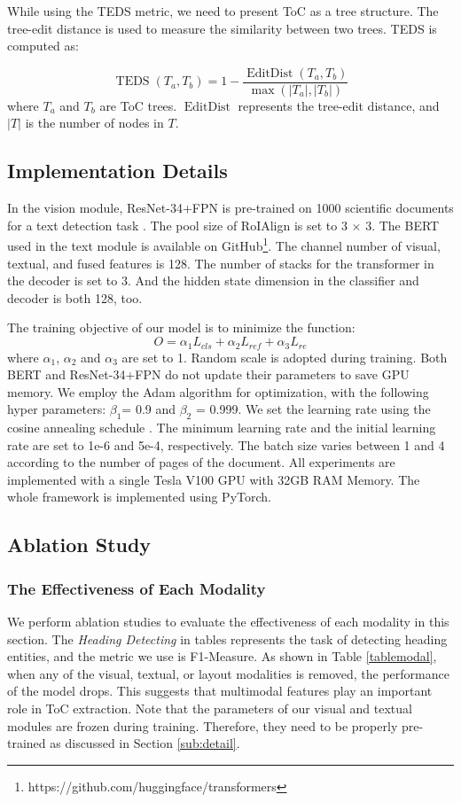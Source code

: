 \documentclass[a4paper,conference]{IEEEtran}
\begin{document}
While using the TEDS metric, we need to present ToC as a tree structure. The tree-edit distance\cite{ted} is used to measure the similarity between two trees. TEDS is computed as:

$$\operatorname{TEDS}\left(T_{a}, T_{b}\right)=1-\frac{\operatorname{EditDist}\left(T_{a}, T_{b}\right)}{\max \left(\left|T_{a}\right|,\left|T_{b}\right|\right)}$$
where $T_a$ and $T_b$ are ToC trees. $\operatorname{EditDist}$ represents the tree-edit distance, and $\left|T\right|$ is the number of nodes in $T$.

\subsection{Implementation Details\label{sub:detail}}
In the vision module, ResNet-34+FPN is pre-trained on 1000 scientific documents for a text detection task \cite{FCOS}. The pool size of RoIAlign is set to 3 $\times$ 3. The BERT used in the text module is available on GitHub\footnote{ https://github.com/huggingface/transformers}. The channel number of visual, textual, and fused features is 128. The number of stacks for the transformer in the decoder is set to 3. And the hidden state dimension in the classifier and decoder is both 128, too.

The training objective of our model is to minimize the function:
$$O = \alpha_1L_{cls} + \alpha_2L_{ref} +  \alpha_3L_{re}$$
where $\alpha_1$, $\alpha_2$ and $\alpha_3$ are set to 1. Random scale is adopted during training. Both BERT and ResNet-34+FPN do not update their parameters to save GPU memory. We employ the Adam algorithm \cite{adam} for optimization, with the following hyper parameters: $\beta_1$= 0.9 and $\beta_2$ = 0.999. We set the learning rate using the cosine annealing schedule \cite{cosineLR}. The minimum learning rate and the initial learning rate are set to 1e-6 and 5e-4, respectively. The batch size varies between 1 and 4 according to the number of pages of the document. All experiments are implemented with a single Tesla V100 GPU with 32GB RAM Memory. The whole framework is implemented using PyTorch. 



\subsection{Ablation Study}
\subsubsection{The Effectiveness of Each Modality}
We perform ablation studies to evaluate the effectiveness of each modality in this section. The \textit{Heading Detecting} in tables represents the task of detecting heading entities, and the metric we use is F1-Measure. As shown in Table \ref{tablemodal}, 
when any of the visual, textual, or layout modalities is removed, the performance of the model drops. This suggests that multimodal features play an important role in ToC extraction. Note that the parameters of our visual and textual modules are frozen during training. Therefore, they need to be properly pre-trained as discussed in Section \ref{sub:detail}.
\end{document}
